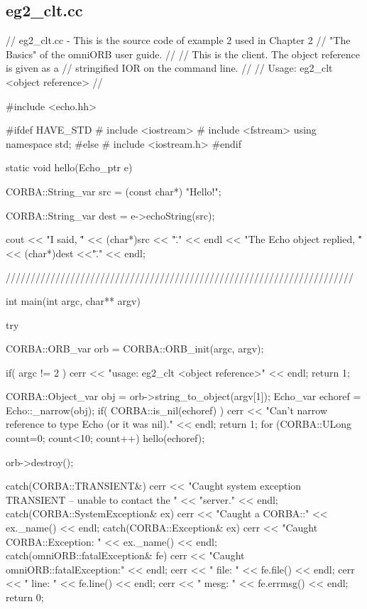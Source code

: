 \documentclass[11pt,twoside,a4paper]{book}
\begin{document}
\clearpage
\subsection{eg2\_clt.cc}

\begin{cxxlisting}
// eg2_clt.cc - This is the source code of example 2 used in Chapter 2
//              "The Basics" of the omniORB user guide.
//
//              This is the client. The object reference is given as a
//              stringified IOR on the command line.
//
// Usage: eg2_clt <object reference>
//

#include <echo.hh>

#ifdef HAVE_STD
#  include <iostream>
#  include <fstream>
   using namespace std;
#else
#  include <iostream.h>
#endif


static void hello(Echo_ptr e)
{
  CORBA::String_var src = (const char*) "Hello!";

  CORBA::String_var dest = e->echoString(src);

  cout << "I said, \"" << (char*)src << "\"." << endl
       << "The Echo object replied, \"" << (char*)dest <<"\"." << endl;
}

//////////////////////////////////////////////////////////////////////

int main(int argc, char** argv)
{


  try {
    CORBA::ORB_var orb = CORBA::ORB_init(argc, argv);

    if( argc != 2 ) {
      cerr << "usage:  eg2_clt <object reference>" << endl;
      return 1;
    }

    CORBA::Object_var obj = orb->string_to_object(argv[1]);
    Echo_var echoref = Echo::_narrow(obj);
    if( CORBA::is_nil(echoref) ) {
      cerr << "Can't narrow reference to type Echo (or it was nil)." << endl;
      return 1;
    }
    for (CORBA::ULong count=0; count<10; count++) 
      hello(echoref);

    orb->destroy();
  }
  catch(CORBA::TRANSIENT&) {
    cerr << "Caught system exception TRANSIENT -- unable to contact the "
         << "server." << endl;
  }
  catch(CORBA::SystemException& ex) {
    cerr << "Caught a CORBA::" << ex._name() << endl;
  }
  catch(CORBA::Exception& ex) {
    cerr << "Caught CORBA::Exception: " << ex._name() << endl;
  }
  catch(omniORB::fatalException& fe) {
    cerr << "Caught omniORB::fatalException:" << endl;
    cerr << "  file: " << fe.file() << endl;
    cerr << "  line: " << fe.line() << endl;
    cerr << "  mesg: " << fe.errmsg() << endl;
  }
  return 0;
}
\end{cxxlisting}
\end{document}

